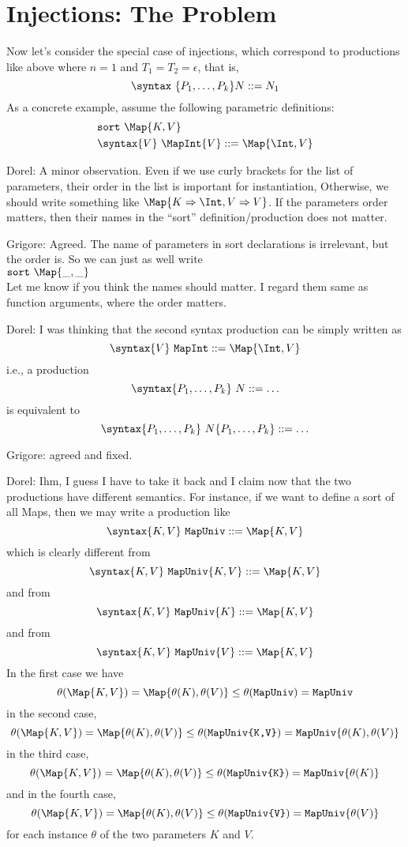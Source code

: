 \documentclass{article}
\newcommand\comment[2]{\par\noindent\color{red}#1: #2\color{black}\par\noindent}
\newcommand\dl{\comment{Dorel}}
\newcommand\gr{\comment{Grigore}}
\theoremstyle{definition}
\theoremstyle{definition}
\theoremstyle{definition}
\theoremstyle{definition}
\theoremstyle{theorem}
\theoremstyle{theorem}
\theoremstyle{theorem}
\theoremstyle{theorem}
\theoremstyle{theorem}
\newcommand{\sort}{\texttt{sort}}
\begin{document}
\section{Injections: The Problem}
Now let's consider the special case of injections,
which correspond to productions like above where
\(n=1\) and \(T_1=T_2=\epsilon\), that is,
\[\syntax\ \{P_1,\ldots,P_k\} N::=N_1\]
As a concrete example, assume the following parametric definitions:
\begin{align*}
&\sort\ \Map{K,V}\\
&\syntax\{V\}\ \MapInt{V} ::= \Map{\Int,V}
\end{align*}
\dl{A minor observation. Even if we use curly brackets for the list of parameters, their order in the list is important for instantiation, Otherwise, we should write something like \(\Map{K\Rightarrow \Int, V\Rightarrow V}\). If the parameters order matters, then their names in the ``sort'' definition/production does not matter.}
\gr{Agreed.  The name of parameters in sort declarations is irrelevant, but the order is.  So we can just as well write\\
\(\sort\ \Map{\_,\_}\)\\
Let me know if you think the names should matter.  I regard them same as function arguments, where the order matters.}
\dl{I was thinking that the second syntax production can be simply written as
\[\syntax\{V\}\ \texttt{MapInt} ::= \Map{\Int, V}\]
i.e., a production
\[\syntax\{P_1,\ldots,P_k\}\ N ::= \ldots\]
is equivalent to
\[\syntax\{P_1,\ldots,P_k\}\ N\{P_1,\ldots,P_k\} ::= \ldots\]
}
\gr{agreed and fixed.}
\dl{Ihm, I guess I have to take it back and I claim now that the two productions have different semantics.
For instance, if we want to define a sort of all Maps, then we may write a production like
\[
\syntax\{K,V\}\ \texttt{MapUniv} ::= \Map{K,V}
\]
which is clearly different from
\[
\syntax\{K,V\}\ \texttt{MapUniv}\{K,V\} ::= \Map{K,V}
\]
and from 
\[
\syntax\{K,V\}\ \texttt{MapUniv}\{K\} ::= \Map{K,V}
\]
and from
\[
\syntax\{K,V\}\ \texttt{MapUniv}\{V\} ::= \Map{K,V}
\]
In the first case we have 
\[
\theta(\Map{K,V})=\Map{\theta(K),\theta(V)}\le \theta(\texttt{MapUniv})=\texttt{MapUniv}
\]
in the second case,
\[
\theta(\Map{K,V})=\Map{\theta(K),\theta(V)}\le \theta(\texttt{MapUniv\{K,V\}})=\texttt{MapUniv}\{\theta(K),\theta(V)\}
\]
 in the third case,
 \[
\theta(\Map{K,V})=\Map{\theta(K),\theta(V)}\le \theta(\texttt{MapUniv\{K\}})=\texttt{MapUniv}\{\theta(K)\}
\]
and in the fourth case,
\[
\theta(\Map{K,V})=\Map{\theta(K),\theta(V)}\le \theta(\texttt{MapUniv\{V\}})=\texttt{MapUniv}\{\theta(V)\}
\]
for each instance $\theta$ of the two parameters $K$ and $V$.
}
\end{document}

